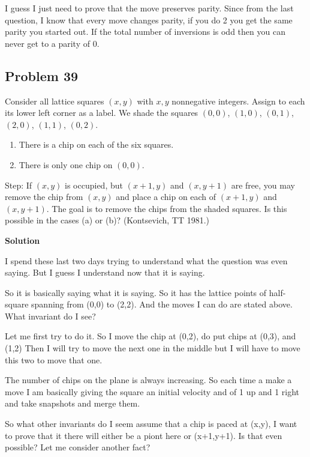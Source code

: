 \documentclass[12pt,tikz,border=10pt]{article}
\theoremstyle{definition}
\theoremstyle{remark}
\begin{document}
I guess I just need to prove that the move preserves parity. Since from the last question,
I know that every move changes parity, if you do 2 you get the same parity you started out.
If the total number of inversions is odd then you can never get to a parity of 0.

\subsection{Problem 39}

Consider all lattice squares $(x, y)$ with $x, y$ nonnegative integers. Assign to each its
lower left corner as a label. We shade the squares $(0, 0)$, $(1, 0)$, $(0, 1)$, $(2, 0)$, $(1, 1)$,
$(0, 2)$. 

\begin{enumerate}[label=(\alph*)]
    \item There is a chip on each of the six squares.
    \item There is only one chip on $(0, 0)$.
\end{enumerate}

Step: If $(x, y)$ is occupied, but $(x +1, y)$ and $(x, y +1)$ are free, you may remove
the chip from $(x, y)$ and place a chip on each of $(x +1, y)$ and $(x, y +1)$. The goal
is to remove the chips from the shaded squares. Is this possible in the cases (a) or
(b)? (Kontsevich, TT 1981.)

\textbf{Solution}

I spend these last two days trying to understand what the question was even saying. But I guess
I understand now that it is saying.

So it is basically saying what it is saying. So it has the lattice points of half-square spanning from (0,0) to (2,2).
And the moves I can do are stated above. What invariant do I see?

Let me first try to do it.
So I move the chip at (0,2), do put chips at (0,3), and (1,2)
Then I will try to move the next one in the middle but I will have to move this two to move that one.

The number of chips on the plane is always increasing. So each time a make a move I am basically giving the square an 
initial velocity and of 1 up and 1 right and take snapshots and merge them.

So what other invariants do I seem 
assume that a chip is paced at (x,y), I want to prove that it there will either be a piont
here or (x+1,y+1). Is that even possible? Let me consider another fact?
\end{document}
